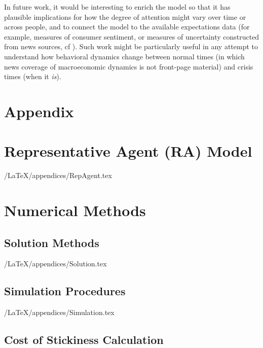 \documentclass[titlepage]{\econtex}\newcommand{\texname}{cAndCwithStickyE}
\begin{document}
In future work, it would be interesting to enrich the model so that it has plausible implications for how the degree of attention might vary over time or across people, and to connect the model to the available expectations data (for example, measures of consumer sentiment, or measures of uncertainty constructed from news sources, cf \cite{bbdUncertainty}).  Such work might be particularly useful in any attempt to understand how behavioral dynamics change between normal times (in which news coverage of macroeconomic dynamics is not front-page material) and crisis times (when it {\it is}).


\processdelayedfloats

\small

\normalsize
\pagebreak




\appendix

\section*{Appendix}

\section{Representative Agent (RA) Model}\label{sec:RepAgent}

\econtexRoot/LaTeX/appendices/RepAgent.tex




\section{Numerical Methods}\label{appendix:Numeric}

\subsection{Solution Methods}\label{appendix:Solution}

\econtexRoot/LaTeX/appendices/Solution.tex


\subsection{Simulation Procedures}\label{appendix:Simulation}

\econtexRoot/LaTeX/appendices/Simulation.tex


\subsection{Cost of Stickiness Calculation}\label{appendix:uCost}
\end{document}
